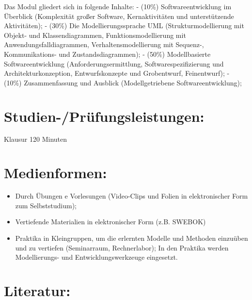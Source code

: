 Das Modul gliedert sich in folgende Inhalte: - (10\%)
Softwareentwicklung im Überblick (Komplexität großer Software,
Kernaktivitäten und unterstützende Aktivitäten); - (30\%) Die
Modellierungssprache UML (Strukturmodellierung mit Objekt- und
Klassendiagrammen, Funktionsmodellierung mit Anwendungsfalldiagrammen,
Verhaltensmodellierung mit Sequenz-, Kommunikations- und
Zustandsdiagrammen); - (50\%) Modellbasierte Softwareentwicklung
(Anforderungsermittlung, Softwarespezifizierung und
Architekturkonzeption, Entwurfskonzepte und Grobentwurf, Feinentwurf); -
(10\%) Zusammenfassung und Ausblick (Modellgetriebene
Softwareentwicklung);

\section{Studien-/Prüfungsleistungen:}\label{studien-pruxfcfungsleistungen-26}

Klausur 120 Minuten

\section{Medienformen:}\label{medienformen-26}

\begin{itemize}
\tightlist
\item
  Durch Übungen e Vorlesungen (Video-Clips und Folien in elektronischer
  Form zum Selbststudium);
\item
  Vertiefende Materialien in elektronischer Form (z.B. SWEBOK)
\item
  Praktika in Kleingruppen, um die erlernten Modelle und Methoden
  einzuüben und zu vertiefen (Seminarraum, Rechnerlabor); In den
  Praktika werden Modellierungs- und Entwicklungswerkzeuge eingesetzt.
\end{itemize}

\section{Literatur:}\label{literatur-26}


